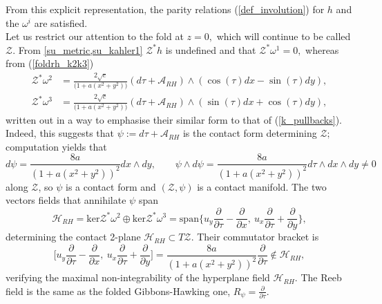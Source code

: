 \documentclass[a4paper,12pt, onecolumn, notitlepage]{article}
\theoremstyle{definition}
\theoremstyle{remark}
\newcommand{\w}{\omega}
\newcommand{\dd}[2]{\frac{\partial #1}{\partial #2}}
\begin{document}
From this explicit representation, the parity relations (\ref{def_involution}) for $h$ and the $\w^{i}$ are satisfied.\\
Let us restrict our attention to the fold at $z=0,$ which will continue to be called $\mathcal{Z}.$ From \cref{su_metric,su_kahler1} $\mathcal{Z}^{\ast}h$ is undefined and that $\mathcal{Z}^{\ast}\w^{1}=0,$ whereas from (\ref{foldrh_k2k3})
\begin{align*}
	\mathcal{Z}^{\ast}\w^{2}&=\frac{2\sqrt{c}}{\big(1+a(x^{2}+y^{2})\big)}(d\tau + \mathcal{A}_{RH})\wedge(\cos(\tau)dx - \sin(\tau)dy),\\
	\mathcal{Z}^{\ast}\w^{3}&=\frac{2\sqrt{c}}{\big(1+a(x^{2}+y^{2})\big)}(d\tau + \mathcal{A}_{RH})\wedge(\sin(\tau)dx + \cos(\tau)dy),
\end{align*}
written out in a way to emphasise their similar form to that of (\ref{k_pullbacks}). Indeed, this suggests that $\psi:= d\tau+\mathcal{A}_{RH}$ is the contact form determining $\mathcal{Z};$ computation yields that
\begin{equation*}
	d\psi = \frac{8a}{(1+a(x^{2} + y^{2}))^{2}}dx\wedge dy,\qquad \psi\wedge d\psi = \frac{8a}{(1+a(x^{2} + y^{2}))^{2}}d\tau\wedge dx\wedge dy\neq 0
\end{equation*}
along $\mathcal{Z}$, so $\psi$ is a contact form and $(\mathcal{Z},\psi)$ is a contact manifold. The two vectors fields that annihilate $\psi$ span
\begin{equation*}
	\mathcal{H}_{RH}=\text{ker}\mathcal{Z}^{\ast}\w^{2}\oplus\text{ker}\mathcal{Z}^{\ast}\w^{3} = \text{span}\bigg\{  u_{y}\dd{}{\tau} - \dd{}{x},\ u_{x}\dd{}{\tau} + \dd{}{y}\bigg\},
\end{equation*}
determining the contact 2-plane $\mathcal{H}_{RH}\subset T\mathcal{Z}.$ Their commutator bracket is
\begin{equation*}
	\bigg[u_{y}\dd{}{\tau} - \dd{}{x},\ u_{x}\dd{}{\tau} + \dd{}{y}\bigg] = \frac{8a}{(1+a(x^{2} + y^{2}))^{2}}\dd{}{\tau}\not\in\mathcal{H}_{RH},
\end{equation*}
verifying the maximal non-integrability of the hyperplane field $\mathcal{H}_{RH}.$ The Reeb field is the same as the folded Gibbons-Hawking one, $R_{\psi} = \dd{}{\tau}.$\\
\end{document}
